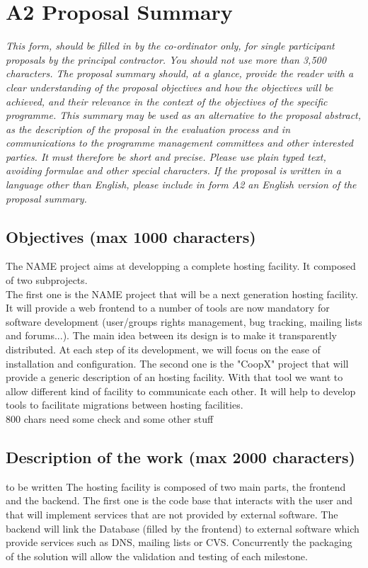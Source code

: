 \documentclass[a4paper,11pt]{report}
\begin{document}
\section*{A2 Proposal Summary}
\textit{This form, should be filled in by the co-ordinator only, for single
participant proposals by the principal contractor. You should not use more than
3,500 characters. The proposal summary should, at a glance, provide the reader
with a clear understanding of the proposal objectives and how the objectives
will be achieved, and their relevance in the context of the objectives of the
specific programme. This summary may be used as an alternative to the proposal
abstract, as the description of the proposal in the evaluation process and in
communications to the programme management committees and other interested
parties. It must therefore be short and precise. Please use plain typed text,
avoiding formulae and other special characters. If the proposal is written in a
language other than English, please include in form A2 an English version of
the proposal summary.} \\
\subsection*{Objectives (max 1000 characters)}
The NAME project aims at developping a complete hosting facility. It composed
of two subprojects. \\
The first one is the NAME project that will be a next generation hosting
facility. It will provide a web frontend to a number of tools are now mandatory
for software development (user/groups rights management, bug tracking, mailing
lists and forums...). The main idea between its design is to make it
transparently distributed. At each step of its development, we will focus on
the ease of installation and configuration.
The second one is the "CoopX" project that will provide a generic description of
an hosting facility. With that tool we want to allow different kind of facility
to communicate each other. It will help to develop tools to facilitate
migrations between hosting facilities.
\\ 800 chars need some check and some other stuff
\subsection*{Description of the work (max 2000 characters)} to be written
The hosting facility is composed of two main parts, the frontend and the
backend. The first one is the code base that interacts with the user and that
will implement services that are not provided by external software. The backend
will link the Database (filled by the frontend) to external software which
provide services such as DNS, mailing lists or CVS. Concurrently the packaging
of the solution will allow the validation and testing of each milestone.
\end{document}
